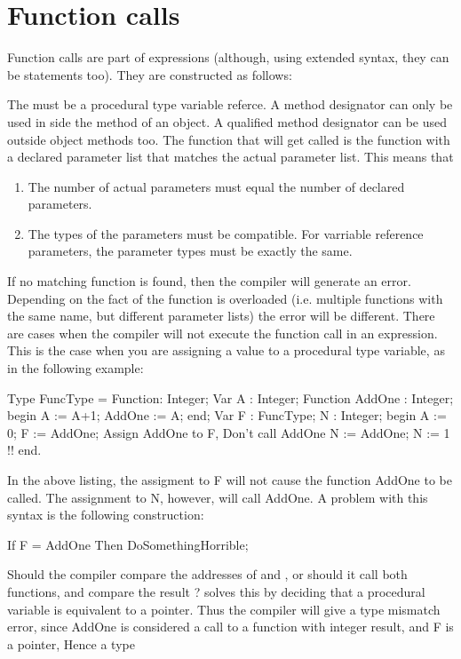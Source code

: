 \documentclass{report}
\begin{document}
\section{Function calls}
Function calls are part of expressions (although, using extended syntax,
they can be statements too). They are constructed as follows:

The  must be a procedural type variable referce.
A method designator can only be used in side the method of an object. A
qualified method designator can be used outside object methods too.
The function that will get called is the function with a declared parameter
list that matches the actual parameter list. This means that
\begin{enumerate}
\item The number of actual parameters must equal the number of declared
parameters.
\item The types of the parameters must be compatible. For varriable
reference parameters, the parameter types must be exactly the same. 
\end{enumerate}
If no matching function is found, then the compiler will generate an error.
Depending on the fact of the function is overloaded (i.e. multiple functions
with the same name, but different parameter lists) the error will be
different.
There are cases when the compiler will not execute the function call in an
expression. This is the case when you are assigning a value to a procedural
type variable, as in the following example:
\begin{listing}
Type 
  FuncType = Function: Integer;
Var A : Integer;
Function AddOne : Integer;
begin
  A := A+1;
  AddOne := A;
end;
Var F : FuncType;
    N : Integer;
begin
  A := 0;
  F := AddOne; { Assign AddOne to F, Don't call AddOne}
  N := AddOne; { N := 1 !!}
end.
\end{listing}
In the above listing, the assigment to F will not cause the function AddOne
to be called. The assignment to N, however, will call AddOne.
A problem with this syntax is the following construction:
\begin{listing}
If F = AddOne Then
  DoSomethingHorrible;
\end{listing}
Should the compiler compare the addresses of  and ,
or should it call both functions, and compare the result ? \fpc solves this
by deciding that a procedural variable is equivalent to a pointer. Thus the
compiler will give a type mismatch error, since AddOne is considered a
call to a function with integer result, and F is a pointer, Hence a type
\end{document}
